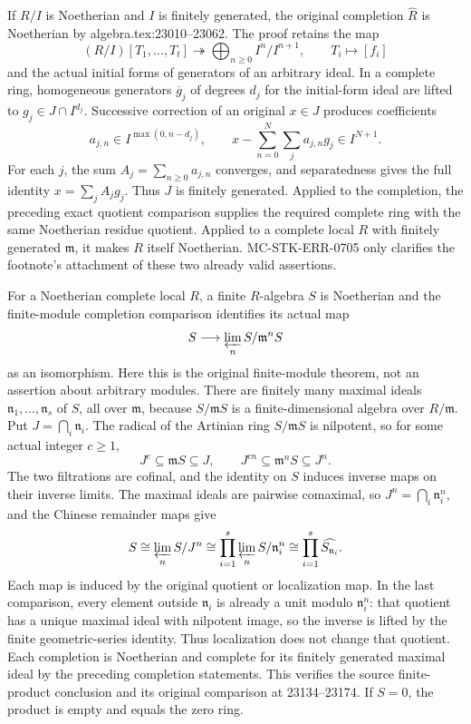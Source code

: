 If \(R/I\) is Noetherian and \(I\) is finitely generated, the original completion \(\widehat R\) is Noetherian by algebra.\AlgebraIdentifierBreak{}tex:\AlgebraIdentifierBreak{}23010--\AlgebraIdentifierBreak{}23062. The proof retains the map \[
 (R/I)[T_1,\ldots,T_t]\twoheadrightarrow
 \bigoplus_{n\geq0}I^n/I^{n+1},\qquad T_i\longmapsto[f_i]
\] and the actual initial forms of generators of an arbitrary ideal. In a complete ring, homogeneous generators \(\overline g_j\) of degrees \(d_j\) for the initial-form ideal are lifted to \(g_j\in J\cap I^{d_j}\). Successive correction of an original \(x\in J\) produces coefficients \[
 a_{j,n}\in I^{\max(0,n-d_j)},\qquad
 x-\sum_{n=0}^{N}\sum_j a_{j,n}g_j\in I^{N+1}.
\] For each \(j\), the sum \(A_j=\sum_{n\geq0}a_{j,n}\) converges, and separatedness gives the full identity \(x=\sum_j A_jg_j\). Thus \(J\) is finitely generated. Applied to the completion, the preceding exact quotient comparison supplies the required complete ring with the same Noetherian residue quotient. Applied to a complete local \(R\) with finitely generated \(\mathfrak m\), it makes \(R\) itself Noetherian. MC-\AlgebraIdentifierBreak{}STK-\AlgebraIdentifierBreak{}ERR-\AlgebraIdentifierBreak{}0705 only clarifies the footnote's attachment of these two already valid assertions.

For a Noetherian complete local \(R\), a finite \(R\)-algebra \(S\) is Noetherian and the finite-module completion comparison identifies its actual map \[
 S\longrightarrow\varprojlim_n S/\mathfrak m^nS
\] as an isomorphism. Here this is the original finite-module theorem, not an assertion about arbitrary modules. There are finitely many maximal ideals \(\mathfrak n_1,\ldots,\mathfrak n_s\) of \(S\), all over \(\mathfrak m\), because \(S/\mathfrak mS\) is a finite-dimensional algebra over \(R/\mathfrak m\). Put \(J=\bigcap_i\mathfrak n_i\). The radical of the Artinian ring \(S/\mathfrak mS\) is nilpotent, so for some actual integer \(c\geq1\), \[
 J^c\subseteq\mathfrak mS\subseteq J,\qquad
 J^{cn}\subseteq\mathfrak m^nS\subseteq J^n.
\] The two filtrations are cofinal, and the identity on \(S\) induces inverse maps on their inverse limits. The maximal ideals are pairwise comaximal, so \(J^n=\bigcap_i\mathfrak n_i^n\), and the Chinese remainder maps give \[
 S\cong\varprojlim_n S/J^n
   \cong\prod_{i=1}^{s}\varprojlim_n S/\mathfrak n_i^n
   \cong\prod_{i=1}^{s}\widehat{S_{\mathfrak n_i}}.
\] Each map is induced by the original quotient or localization map. In the last comparison, every element outside \(\mathfrak n_i\) is already a unit modulo \(\mathfrak n_i^n\): that quotient has a unique maximal ideal with nilpotent image, so the inverse is lifted by the finite geometric-series identity. Thus localization does not change that quotient. Each completion is Noetherian and complete for its finitely generated maximal ideal by the preceding completion statements. This verifies the source finite-product conclusion and its original comparison at 23134--23174. If \(S=0\), the product is empty and equals the zero ring.

